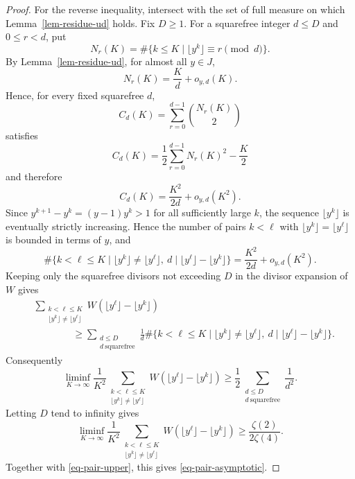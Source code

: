 \documentclass[11pt,reqno]{amsart}
\numberwithin{equation}{section}
\begin{document}
\begin{proof}
        For the reverse inequality, intersect with the set of full measure on which Lemma~\ref{lem-residue-ud} holds. Fix $D\ge1$. For a squarefree integer $d\le D$ and $0\le r<d$, put
        $$
        N_r(K)=\#\{k\le K\mid \lfloor y^k\rfloor\equiv r\pmod d\}.
        $$
        By Lemma~\ref{lem-residue-ud}, for almost all $y\in J$,
        $$
        N_r(K)=\frac Kd+o_{y,d}(K).
        $$
        Hence, for every fixed squarefree $d$,
        $$
        C_d(K)=\sum_{r=0}^{d-1}\binom{N_r(K)}2
        $$
        satisfies
        $$
        C_d(K)=\frac12\sum_{r=0}^{d-1}N_r(K)^2-\frac K2
        $$
        and therefore
        $$
        C_d(K)=\frac{K^2}{2d}+o_{y,d}(K^2).
        $$
        Since $y^{k+1}-y^k=(y-1)y^k>1$ for all sufficiently large $k$, the sequence $\lfloor y^k\rfloor$ is eventually strictly increasing. Hence the number of pairs $k<\ell$ with $\lfloor y^k\rfloor=\lfloor y^\ell\rfloor$ is bounded in terms of $y$, and
        $$
        \#\{k<\ell\le K\mid \lfloor y^k\rfloor\ne\lfloor y^\ell\rfloor,\ d\mid \lfloor y^\ell\rfloor-\lfloor y^k\rfloor\}
        =\frac{K^2}{2d}+o_{y,d}(K^2).
        $$
        Keeping only the squarefree divisors not exceeding $D$ in the divisor expansion of $W$ gives
        $$
        \begin{aligned}
            &\sum_{\substack{k<\ell\le K\\ \lfloor y^k\rfloor\ne\lfloor y^\ell\rfloor}}
            W\!\left(\lfloor y^\ell\rfloor-\lfloor y^k\rfloor\right)\\
            &\qquad\qquad\ge
            \sum_{\substack{d\le D\\d\ \mathrm{squarefree}}}\frac1d
            \#\{k<\ell\le K\mid \lfloor y^k\rfloor\ne\lfloor y^\ell\rfloor,\ d\mid \lfloor y^\ell\rfloor-\lfloor y^k\rfloor\}.
        \end{aligned}
        $$
        Consequently
        $$
        \liminf_{K\to\infty}\frac1{K^2}
        \sum_{\substack{k<\ell\le K\\ \lfloor y^k\rfloor\ne\lfloor y^\ell\rfloor}}
        W\!\left(\lfloor y^\ell\rfloor-\lfloor y^k\rfloor\right)
        \ge
        \frac12\sum_{\substack{d\le D\\d\ \mathrm{squarefree}}}\frac1{d^2}.
        $$
        Letting $D$ tend to infinity gives
        $$
        \liminf_{K\to\infty}\frac1{K^2}
        \sum_{\substack{k<\ell\le K\\ \lfloor y^k\rfloor\ne\lfloor y^\ell\rfloor}}
        W\!\left(\lfloor y^\ell\rfloor-\lfloor y^k\rfloor\right)
        \ge \frac{\zeta(2)}{2\zeta(4)}.
        $$
        Together with \eqref{eq-pair-upper}, this gives \eqref{eq-pair-asymptotic}.
    \end{proof}
\end{document}
